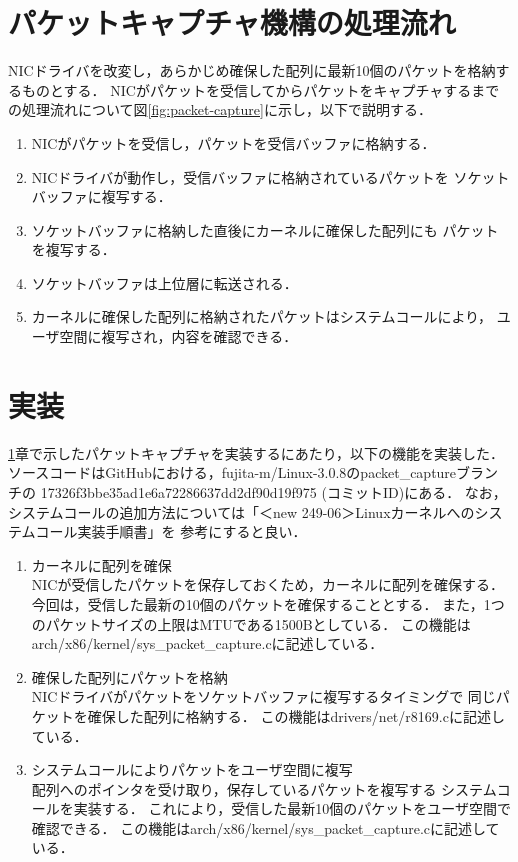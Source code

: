\documentclass[12pt]{jsarticle}
\begin{document}
\section{パケットキャプチャ機構の処理流れ}\label{syorinagare}
NICドライバを改変し，あらかじめ確保した配列に最新10個のパケットを格納するものとする．
NICがパケットを受信してからパケットをキャプチャするまでの処理流れについて図\ref{fig:packet-capture}に示し，以下で説明する．
\begin{enumerate}
    \item NICがパケットを受信し，パケットを受信バッファに格納する．
    \item NICドライバが動作し，受信バッファに格納されているパケットを
        ソケットバッファに複写する．
    \item ソケットバッファに格納した直後にカーネルに確保した配列にも
        パケットを複写する．
    \item ソケットバッファは上位層に転送される．
    \item カーネルに確保した配列に格納されたパケットはシステムコールにより，
        ユーザ空間に複写され，内容を確認できる．
\end{enumerate}

\section{実装}
\ref{syorinagare}章で示したパケットキャプチャを実装するにあたり，以下の機能を実装した．
ソースコードは\mbox{GitHub}における，\mbox{fujita-m/Linux-3.0.8}の\mbox{packet\_capture}ブランチの
17326f3bbe35ad1e6a72286637d\newline d2df90d19f975 (コミットID)にある．
なお，システムコールの追加方法については「＜new 249-06＞Linuxカーネルへのシステムコール実装手順書」を
参考にすると良い．
\begin{enumerate}
    \item カーネルに配列を確保\\
        NICが受信したパケットを保存しておくため，カーネルに配列を確保する．
        今回は，受信した最新の10個のパケットを確保することとする．
        また，1つのパケットサイズの上限はMTUである1500Bとしている．
        この機能はarch/x86/kernel/sys\_packet\_capture.cに記述している．
    \item 確保した配列にパケットを格納\\
        NICドライバがパケットをソケットバッファに複写するタイミングで
        同じパケットを確保した配列に格納する．
        この機能はdrivers/net/r8169.cに記述している．
    \item システムコールによりパケットをユーザ空間に複写\\
        配列へのポインタを受け取り，保存しているパケットを複写する
        システムコールを実装する．
        これにより，受信した最新10個のパケットをユーザ空間で確認できる．
        この機能はarch/x86/kernel/sys\_packet\_capture.cに記述している．
\end{enumerate}
\end{document}
